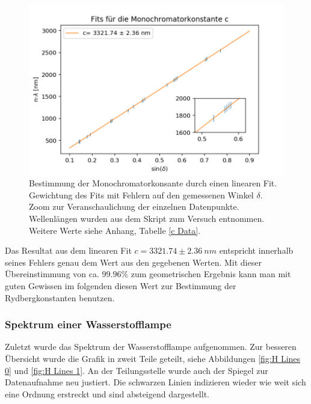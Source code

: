 \documentclass[]{article}
\begin{document}
\begin{figure}[!h]
\centering
\includegraphics[width=.9\linewidth]{Plots/Monochromatorkonstante.png}
\caption{Bestimmung der Monochromatorkonsante durch einen linearen Fit. Gewichtung des Fits mit Fehlern auf den gemessenen Winkel $\delta$. Zoom zur Veranschaulichung der einzelnen Datenpunkte. Wellenlängen wurden aus dem Skript zum Versuch \cite{skript} entnommen. Weitere Werte siehe Anhang, Tabelle \ref{c Data}. }
\label{fig:MonoConst}
\end{figure}

Das Resultat aus dem linearen Fit $c = 3321.74 \pm 2.36 \: nm$ entspricht innerhalb seines Fehlers genau dem Wert aus den gegebenen Werten. Mit dieser Übereinstimmung von ca. $99.96\%$ zum geometrischen Ergebnis kann man mit guten Gewissen im folgenden diesen Wert zur Bestimmung der Rydbergkonstanten benutzen.

\subsubsection{Spektrum einer Wasserstofflampe}
Zuletzt wurde das Spektrum der Wasserstofflampe aufgenommen. Zur besseren Übersicht wurde die Grafik in zweit Teile geteilt, siehe Abbildungen \ref{fig:H Lines 0} und \ref{fig:H Lines 1}. An der Teilungsstelle wurde auch der Spiegel zur Datenaufnahme neu justiert. Die schwarzen Linien indizieren wieder wie weit sich eine Ordnung erstreckt und sind absteigend dargestellt.
\end{document}
